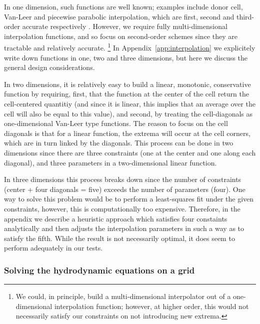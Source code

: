 In one dimension, such functions are well known; examples include
donor cell, Van-Leer and piecewise parabolic interpolation, which are
first, second and third-order accurate respectively \citep[e.g.,][]{Stone92a}.
However, we require fully multi-dimensional interpolation functions, and so
focus on second-order schemes since they are tractable and
relatively accurate. 
\footnote{We could, in principle, build a multi-dimensional interpolator out
of a one-dimensional interpolation function; however, at higher order, this would not necessarily
satisfy our constraints on not introducing new extrema.}
In Appendix~\ref{app:interpolation} we explicitely write down
functions in one, two and three dimensions, but here we discuss the
general design considerations.

In two dimensions, it is relatively easy to build a linear, monotonic,
conservative function by requiring, first, that the function at the
center of the cell return the cell-centered quantitiy (and since it is
linear, this implies that an average over the cell will also be equal
to this value), and second, by treating the cell-diagonals as
one-dimensional Van-Leer type functions.  The reason to focus on the
cell diagonals is that for a linear function, the extrema will occur at the cell 
corners, which are in turn linked by the diagonals.  This process can be done in
two dimensions since there are three constraints (one at the center and one along
each diagonal), and three parameters in a two-dimensional linear
function.

In three dimensions this process breaks down since the number of
constraints (center + four diagonals = five) exceeds the number of
parameters (four).  One way to solve this problem would be to perform
a least-squares fit under the given constraints, however, this is
computationally too expensive.  Therefore, in the appendix we describe
a heuristic approach which satisfies four constaints analytically and
then adjusts the interpolation parameters in such a way as to satisfy the fifth.
While the result is not necessarily optimal, it does seem to perform
adequately in our tests.


\subsubsection{Solving the hydrodynamic equations on a grid}
\label{sec:solve_hydro}

